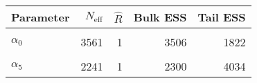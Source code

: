 \begin{table}[!h]
\centering
\begin{tabular}{>{\raggedright\arraybackslash}p{2cm}rrrr}
\toprule
Parameter & $N_{\text{eff}}$ & $\widehat{R}$ & Bulk ESS & Tail ESS\\
\midrule
\cellcolor{gray!6}{$\rho$} & \cellcolor{gray!6}{40576} & \cellcolor{gray!6}{1} & \cellcolor{gray!6}{40676} & \cellcolor{gray!6}{41416}\\
$\alpha_{0}$ & 3561 & 1 & 3506 & 1822\\
\cellcolor{gray!6}{$\alpha_{2}$} & \cellcolor{gray!6}{2895} & \cellcolor{gray!6}{1} & \cellcolor{gray!6}{3408} & \cellcolor{gray!6}{1888}\\
$\alpha_{5}$ & 2241 & 1 & 2300 & 4034\\
\bottomrule
\end{tabular}
\end{table}